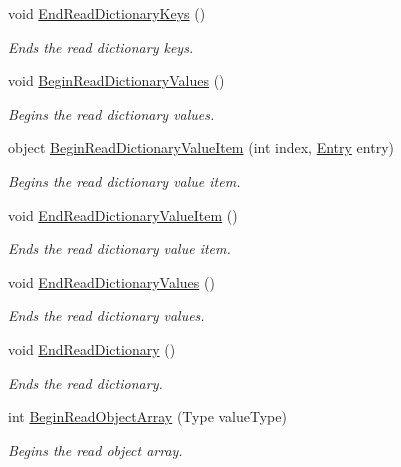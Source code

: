 \begin{DoxyCompactItemize}
void \hyperlink{interface_serialization_1_1_i_storage_a4d7be7471ebc9555ec62f3d1e91b53a8}{End\+Read\+Dictionary\+Keys} ()
\begin{DoxyCompactList}\small\item\em Ends the read dictionary keys. \end{DoxyCompactList}\item 
void \hyperlink{interface_serialization_1_1_i_storage_ad25b5e89d4ae0b91dccf8c0ce2187f15}{Begin\+Read\+Dictionary\+Values} ()
\begin{DoxyCompactList}\small\item\em Begins the read dictionary values. \end{DoxyCompactList}\item 
object \hyperlink{interface_serialization_1_1_i_storage_ab25360e5a7b453f7cbcf2a8d98ea0eb8}{Begin\+Read\+Dictionary\+Value\+Item} (int index, \hyperlink{class_serialization_1_1_entry}{Entry} entry)
\begin{DoxyCompactList}\small\item\em Begins the read dictionary value item. \end{DoxyCompactList}\item 
void \hyperlink{interface_serialization_1_1_i_storage_a34f240c50bd8a6811cdde7d564fab443}{End\+Read\+Dictionary\+Value\+Item} ()
\begin{DoxyCompactList}\small\item\em Ends the read dictionary value item. \end{DoxyCompactList}\item 
void \hyperlink{interface_serialization_1_1_i_storage_af76c715808ff9cca9b89c995a556ec6b}{End\+Read\+Dictionary\+Values} ()
\begin{DoxyCompactList}\small\item\em Ends the read dictionary values. \end{DoxyCompactList}\item 
void \hyperlink{interface_serialization_1_1_i_storage_a361427cb53d37e663b456b97d087575b}{End\+Read\+Dictionary} ()
\begin{DoxyCompactList}\small\item\em Ends the read dictionary. \end{DoxyCompactList}\item 
int \hyperlink{interface_serialization_1_1_i_storage_a4d7741da3862a1398e0566d362eb0827}{Begin\+Read\+Object\+Array} (Type value\+Type)
\begin{DoxyCompactList}\small\item\em Begins the read object array. \end{DoxyCompactList}\item 

\end{DoxyCompactItemize}
